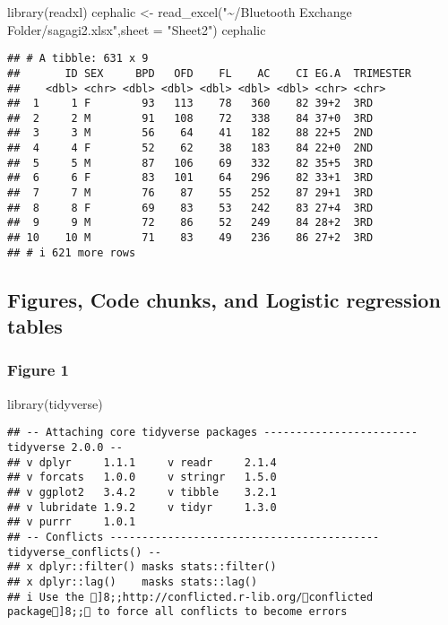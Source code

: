 \documentclass[
]{article}
\newenvironment{Shaded}{\begin{snugshade}}{\end{snugshade}}
\newcommand{\AttributeTok}[1]{\textcolor[rgb]{0.77,0.63,0.00}{#1}}
\newcommand{\FunctionTok}[1]{\textcolor[rgb]{0.00,0.00,0.00}{#1}}
\newcommand{\NormalTok}[1]{#1}
\newcommand{\OtherTok}[1]{\textcolor[rgb]{0.56,0.35,0.01}{#1}}
\newcommand{\StringTok}[1]{\textcolor[rgb]{0.31,0.60,0.02}{#1}}
\begin{document}
\begin{Shaded}
\begin{Highlighting}[]
\FunctionTok{library}\NormalTok{(readxl)}
\NormalTok{cephalic }\OtherTok{\textless{}{-}} \FunctionTok{read\_excel}\NormalTok{(}\StringTok{"\textasciitilde{}/Bluetooth Exchange Folder/sagagi2.xlsx"}\NormalTok{,}\AttributeTok{sheet =} \StringTok{"Sheet2"}\NormalTok{)}
\NormalTok{cephalic}
\end{Highlighting}
\end{Shaded}

\begin{verbatim}
## # A tibble: 631 x 9
##       ID SEX     BPD   OFD    FL    AC    CI EG.A  TRIMESTER
##    <dbl> <chr> <dbl> <dbl> <dbl> <dbl> <dbl> <chr> <chr>    
##  1     1 F        93   113    78   360    82 39+2  3RD      
##  2     2 M        91   108    72   338    84 37+0  3RD      
##  3     3 M        56    64    41   182    88 22+5  2ND      
##  4     4 F        52    62    38   183    84 22+0  2ND      
##  5     5 M        87   106    69   332    82 35+5  3RD      
##  6     6 F        83   101    64   296    82 33+1  3RD      
##  7     7 M        76    87    55   252    87 29+1  3RD      
##  8     8 F        69    83    53   242    83 27+4  3RD      
##  9     9 M        72    86    52   249    84 28+2  3RD      
## 10    10 M        71    83    49   236    86 27+2  3RD      
## # i 621 more rows
\end{verbatim}

\hypertarget{figures-code-chunks-and-logistic-regression-tables}{%
\subsection{Figures, Code chunks, and Logistic regression
tables}\label{figures-code-chunks-and-logistic-regression-tables}}

\hypertarget{figure-1}{%
\subsubsection{\texorpdfstring{\textbf{Figure
1}}{Figure 1}}\label{figure-1}}

\begin{Shaded}
\begin{Highlighting}[]
\FunctionTok{library}\NormalTok{(tidyverse)}
\end{Highlighting}
\end{Shaded}

\begin{verbatim}
## -- Attaching core tidyverse packages ------------------------ tidyverse 2.0.0 --
## v dplyr     1.1.1     v readr     2.1.4
## v forcats   1.0.0     v stringr   1.5.0
## v ggplot2   3.4.2     v tibble    3.2.1
## v lubridate 1.9.2     v tidyr     1.3.0
## v purrr     1.0.1     
## -- Conflicts ------------------------------------------ tidyverse_conflicts() --
## x dplyr::filter() masks stats::filter()
## x dplyr::lag()    masks stats::lag()
## i Use the ]8;;http://conflicted.r-lib.org/conflicted package]8;; to force all conflicts to become errors
\end{verbatim}
\end{document}
